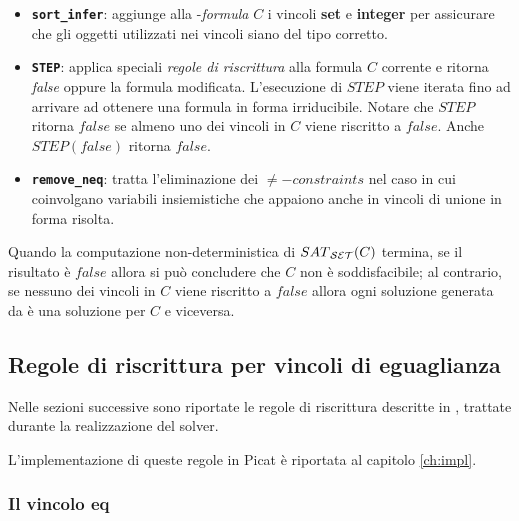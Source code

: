 \documentclass[12pt,a4paper,openright]{book} %
\begin{document}
\begin{itemize}
	\item \textbf{\texttt{sort\_infer}}: aggiunge alla
          \calset{}-\textit{formula} $C$ i vincoli \textbf{set} e
          \textbf{integer} per assicurare che gli oggetti utilizzati
          nei vincoli siano del tipo corretto.
	
	\item \textbf{\texttt{STEP}}: applica speciali \textit{regole
          di riscrittura} alla formula $C$ corrente e ritorna
          \textit{false} oppure la formula modificata. L'esecuzione di
          $STEP$ viene iterata fino ad arrivare ad ottenere una
          formula in forma irriducibile. Notare che $STEP$ ritorna
          $false$ se almeno uno dei vincoli in $C$ viene riscritto a
          $false$. Anche $STEP(false)$ ritorna $false$.
	
	\item \textbf{\texttt{remove\_neq}}: tratta l'eliminazione dei
          $\neq-constraints$ nel caso in cui coinvolgano variabili
          insiemistiche che appaiono anche in vincoli di unione in
          forma risolta.
\end{itemize}

Quando la computazione non-deterministica di $SAT\textsubscript{\ensuremath{\mathcal{S}}\ensuremath{\mathcal{E}}\ensuremath{\mathcal{T}}}{}(C)$ termina,
se il risultato è $false$ allora si può concludere che $C$ non è
soddisfacibile; al contrario, se nessuno dei vincoli in $C$ viene
riscritto a $false$ allora ogni soluzione generata da \satset{} è una
soluzione per $C$ e viceversa.

\subsection{Regole di riscrittura per vincoli di eguaglianza}
\label{subsec:clpbasedlang_lset_rewriteeq}


Nelle sezioni successive sono riportate le regole di riscrittura
descritte in \cite{Rossi18}, trattate durante la realizzazione del
solver.

L'implementazione di queste regole in Picat è riportata al capitolo
\ref{ch:impl}.

\subsubsection{Il vincolo eq}
\end{document}
